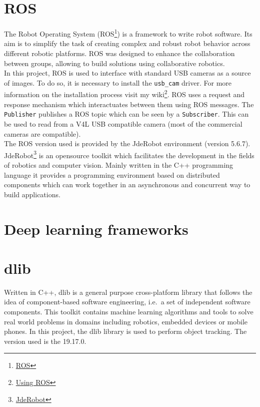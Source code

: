 \section{ROS}
The Robot Operating System (ROS\footnote {\href{https://www.ros.org/}{ROS}}) is a framework to write robot software. Its aim is to simplify the task of creating complex and robust robot behavior across different robotic platforms. ROS was designed to enhance the collaboration between groups, allowing to build solutions using collaborative robotics.\\
In this project, ROS is used to interface with standard USB cameras as a source of images. To do so, it is necessary to install the \texttt{usb\_cam} driver. For more information on the installation process visit my wiki\footnote {\label{using_ros}\href{https://jderobot.org/Arodriguez-tfm\#Week_24:_Introducing_ROS}{Using ROS}}. ROS uses a request and response mechanism which interactuates between them using ROS messages. The \texttt{Publisher} publishes a ROS topic which can be seen by a \texttt{Subscriber}. This can be used to read from a V4L USB compatible camera (most of the commercial cameras are compatible).\\
The ROS version used is provided by the JdeRobot environment (version 5.6.7).\\
JdeRobot\footnote {\href{https://jderobot.org/Main_Page}{JdeRobot}} is an opensource toolkit which facilitates the development in the fields of robotics and computer vision. Mainly written in the C++ programming language it provides a programming environment based on distributed components which can work together in an asynchronous and concurrent way to build applications.

\section{Deep learning frameworks}

\section{dlib}
Written in C++, dlib is a general purpose cross-platform library that follows the idea of component-based software engineering, i.e.\ a set of independent software components. This toolkit contains machine learning algorithms and tools to solve real world problems in domains including robotics, embedded devices or mobile phones. In this project, the dlib library is used to perform object tracking. The version used is the 19.17.0.
